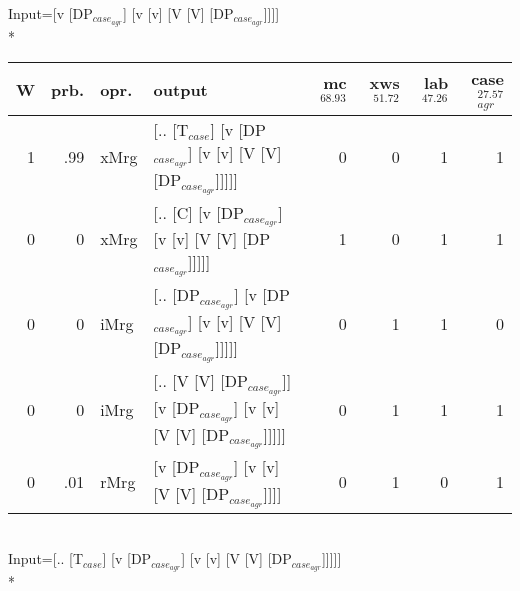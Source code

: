 \begingroup\scriptsize Input=[v [DP$_{case_{agr}}$] [v [v] [V [V] [DP$_{case_{agr}}$]]]]\\*
\begin{tabularx}{\linewidth}{rrlXrrrr}
\hline
   W &   prb. & opr.   & output                                                                     &   mc$^{68.93}$ &   xws$^{51.72}$ &   lab$^{47.26}$ &   case$_{agr}^{27.57}$ \\
\hline
   1 &   .99 & xMrg & [.. [T$_{case}$] [v [DP$_{case_{agr}}$] [v [v] [V [V] [DP$_{case_{agr}}$]]]]]              &            0 &             0 &             1 &                  1 \\
   0 &   0 & xMrg & [.. [C] [v [DP$_{case_{agr}}$] [v [v] [V [V] [DP$_{case_{agr}}$]]]]]                   &            1 &             0 &             1 &                  1 \\
   0 &   0 & iMrg & [.. [DP$_{case_{agr}}$] [v [DP$_{case_{agr}}$] [v [v] [V [V] [DP$_{case_{agr}}$]]]]]         &            0 &             1 &             1 &                  0 \\
   0 &   0 & iMrg & [.. [V [V] [DP$_{case_{agr}}$]] [v [DP$_{case_{agr}}$] [v [v] [V [V] [DP$_{case_{agr}}$]]]]] &            0 &             1 &             1 &                  1 \\
   0 &   .01 & rMrg & [v [DP$_{case_{agr}}$] [v [v] [V [V] [DP$_{case_{agr}}$]]]]                            &            0 &             1 &             0 &                  1 \\
\hline
\end{tabularx}\endgroup\\
\begingroup\scriptsize Input=[.. [T$_{case}$] [v [DP$_{case_{agr}}$] [v [v] [V [V] [DP$_{case_{agr}}$]]]]]\\*

